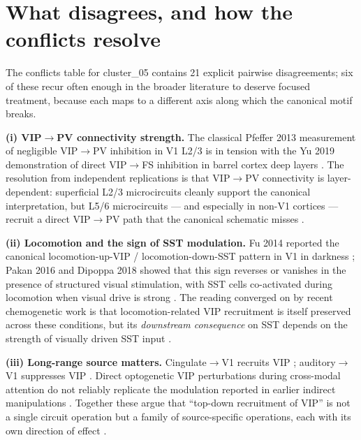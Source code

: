 \documentclass[11pt]{article}
\let\origrightarrow\rightarrow
\def\rightarrow{\ensuremath{\origrightarrow}}
\begin{document}
\section{What disagrees, and how the conflicts resolve}

The conflicts table for cluster\_05 contains 21 explicit pairwise disagreements; six of these recur often enough in the broader literature to deserve focused treatment, because each maps to a different axis along which the canonical motif breaks.

\textbf{(i) VIP\rightarrow PV connectivity strength.} The classical Pfeffer 2013 measurement of negligible VIP\rightarrow PV inhibition in V1 L2/3 is in tension with the Yu 2019 demonstration of direct VIP\rightarrow FS inhibition in barrel cortex deep layers \citep{Pfeffer2013, Yu2019}. The resolution from independent replications \citep{Walker2016, Pi2013, Anastasiades2021a} is that VIP\rightarrow PV connectivity is layer-dependent: superficial L2/3 microcircuits cleanly support the canonical interpretation, but L5/6 microcircuits --- and especially in non-V1 cortices --- recruit a direct VIP\rightarrow PV path that the canonical schematic misses \citep{Yu2019, Walker2016, Anastasiades2021a, Pi2013, Zhou2017}.

\textbf{(ii) Locomotion and the sign of SST modulation.} Fu 2014 reported the canonical locomotion-up-VIP / locomotion-down-SST pattern in V1 in darkness \citep{Fu2014}; Pakan 2016 and Dipoppa 2018 showed that this sign reverses or vanishes in the presence of structured visual stimulation, with SST cells co-activated during locomotion when visual drive is strong \citep{Pakan2016, Dipoppa2018, Kaneko2024}. The reading converged on by recent chemogenetic work is that locomotion-related VIP recruitment is itself preserved across these conditions, but its \textit{downstream consequence} on SST depends on the strength of visually driven SST input \citep{Sabri2024, Pakan2016, Dipoppa2018, Kaneko2024}.

\textbf{(iii) Long-range source matters.} Cingulate\rightarrow V1 recruits VIP \citep{Zhang2014, Stachniak2023}; auditory\rightarrow V1 suppresses VIP \citep{Ibrahim2016}. Direct optogenetic VIP perturbations during cross-modal attention do not reliably replicate the modulation reported in earlier indirect manipulations \citep{Ibrahim2016, Anastasiades2021a, Sabri2024}. Together these argue that ``top-down recruitment of VIP'' is not a single circuit operation but a family of source-specific operations, each with its own direction of effect \citep{Ibrahim2016, Anastasiades2021a, Stachniak2023}.
\end{document}
